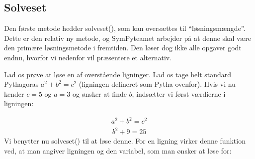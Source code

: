 \documentclass[letterpaper,10pt,english]{jupyterBook}
\begin{document}
\subsection{Solveset}
\label{\detokenize{notebooks/sympy/Notebook3_ligninger:solveset}}
Den første metode hedder solveset(), som kan oversættes til “løsningsmængde”. Dette er den relativ ny metode, og SymPy\sphinxhyphen{}teamet arbejder på at denne skal være den primære løsningsmetode i fremtiden. Den løser dog ikke alle opgaver godt endnu, hvorfor vi nedenfor vil præsentere et alternativ.

Lad os prøve at løse en af overstående ligninger. Lad os tage helt standard Pythagoras \(a^2 + b^2 = c^2\) (ligningen defineret som Pytha ovenfor). Hvis vi nu  kender \(c=5\) og \(a=3\) og ønsker at finde \(b\), indsætter vi først værdierne i ligningen:

\begin{sphinxVerbatim}[commandchars=\\\{\}]
  \PYG{p}{[}   \PYG{p}{]}
\end{sphinxVerbatim}
\begin{equation*}
\begin{split}\displaystyle a^{2} + b^{2} = c^{2}\end{split}
\end{equation*}\begin{equation*}
\begin{split}\displaystyle b^{2} + 9 = 25\end{split}
\end{equation*}
Vi benytter nu solveset() til at løse denne. For en ligning virker denne funktion ved, at man angiver ligningen og den variabel, som man ønsker at løse for:
\end{document}
